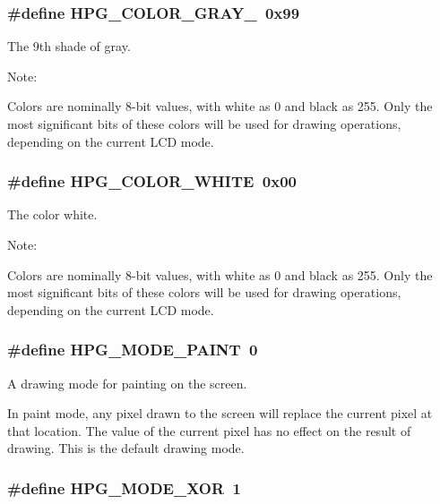 \subsubsection{\setlength{\rightskip}{0pt plus 5cm}\#define HPG\_\-COLOR\_\-GRAY\_\ 0x99}\label{hpgraphics_8h_a11}


The 9th shade of gray.

\begin{Desc}
\item[Note: ]\par
Colors are nominally 8-bit values, with white as 0 and black as 255. Only the most significant bits of these colors will be used for drawing operations, depending on the current LCD mode. \end{Desc}
\subsubsection{\setlength{\rightskip}{0pt plus 5cm}\#define HPG\_\-COLOR\_\-WHITE\ 0x00}\label{hpgraphics_8h_a2}


The color white.

\begin{Desc}
\item[Note: ]\par
Colors are nominally 8-bit values, with white as 0 and black as 255. Only the most significant bits of these colors will be used for drawing operations, depending on the current LCD mode. \end{Desc}
\subsubsection{\setlength{\rightskip}{0pt plus 5cm}\#define HPG\_\-MODE\_\-PAINT\ 0}\label{hpgraphics_8h_a0}


A drawing mode for painting on the screen.

In paint mode, any pixel drawn to the screen will replace the current pixel at that location. The value of the current pixel has no effect on the result of drawing. This is the default drawing mode. 
\subsubsection{\setlength{\rightskip}{0pt plus 5cm}\#define HPG\_\-MODE\_\-XOR\ 1}\label{hpgraphics_8h_a1}


